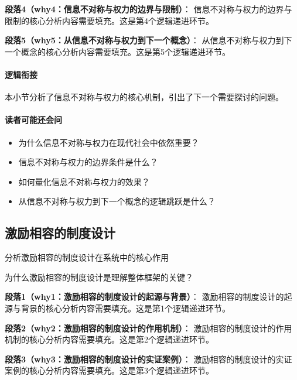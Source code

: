 \documentclass[../main.tex]{subfiles}
\begin{document}
{{\textbf{段落4（why4：信息不对称与权力的边界与限制）}：
信息不对称与权力的边界与限制的核心分析内容需要填充。这是第4个逻辑递进环节。


\textbf{段落5（why5：从信息不对称与权力到下一个概念）}：
从信息不对称与权力到下一个概念的核心分析内容需要填充。这是第5个逻辑递进环节。


\paragraph*{逻辑衔接}
本小节分析了信息不对称与权力的核心机制，引出了下一个需要探讨的问题。

\paragraph*{读者可能还会问}
\begin{itemize}
\item 为什么信息不对称与权力在现代社会中依然重要？
\item 信息不对称与权力的边界条件是什么？
\item 如何量化信息不对称与权力的效果？
\item 从信息不对称与权力到下一个概念的逻辑跳跃是什么？
\end{itemize}


\subsection{激励相容的制度设计}

\begin{motivation}
分析激励相容的制度设计在系统中的核心作用
\end{motivation}

\begin{logicmap}
[逻辑链占位]
\end{logicmap}

\begin{questionbox}
为什么激励相容的制度设计是理解整体框架的关键？
\end{questionbox}

\textbf{段落1（why1：激励相容的制度设计的起源与背景）}：
激励相容的制度设计的起源与背景的核心分析内容需要填充。这是第1个逻辑递进环节。


\textbf{段落2（why2：激励相容的制度设计的作用机制）}：
激励相容的制度设计的作用机制的核心分析内容需要填充。这是第2个逻辑递进环节。


\textbf{段落3（why3：激励相容的制度设计的实证案例）}：
激励相容的制度设计的实证案例的核心分析内容需要填充。这是第3个逻辑递进环节。


}}
\end{document}
